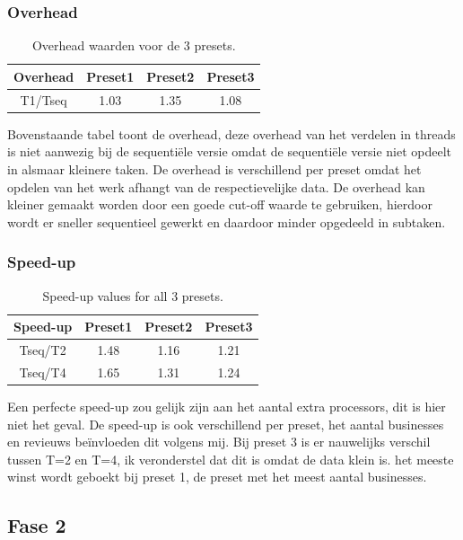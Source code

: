 \documentclass[]{article}
\begin{document}
\subsubsection{Overhead}

\begin{table}[h!]
	\centering
\begin{tabular}{|c|c|c|c|}
	\hline 
	Overhead & Preset1 & Preset2 & Preset3 \\ 
	\hline 
	T1/Tseq & 1.03 & 1.35 & 1.08 \\ 
	\hline 
\end{tabular} 
\caption{Overhead waarden voor de 3 presets.}
\label{table:2}
\end{table}

Bovenstaande tabel toont de overhead, deze overhead van het verdelen in threads is niet aanwezig bij de sequentiële versie omdat de sequentiële versie niet opdeelt in alsmaar kleinere taken. De overhead is verschillend per preset omdat het opdelen van het werk afhangt van de respectievelijke data.
De overhead kan kleiner gemaakt worden door een goede cut-off waarde te gebruiken, hierdoor wordt er sneller sequentieel gewerkt en daardoor minder opgedeeld in subtaken.

\subsubsection{Speed-up}
\begin{table}[h!]
	\centering
	\begin{tabular}{|c|c|c|c|}
		\hline 
		Speed-up & Preset1 & Preset2 & Preset3 \\ 
		\hline 
		Tseq/T2 & 1.48 & 1.16 & 1.21 \\ 
		\hline 
		\hline 
		Tseq/T4 & 1.65 & 1.31 & 1.24 \\ 
		\hline 
	\end{tabular} 
	\caption{Speed-up values for all 3 presets.}
	\label{table:2}
\end{table}

Een perfecte speed-up zou gelijk zijn aan het aantal extra processors, dit is hier niet het geval.
De speed-up is ook verschillend per preset, het aantal businesses en revieuws beïnvloeden dit volgens mij.
Bij preset 3 is er nauwelijks verschil tussen T=2 en T=4, ik veronderstel dat dit is omdat de data klein is.
het meeste winst wordt geboekt bij preset 1, de preset met het meest aantal businesses.

\subsection{Fase 2}
\end{document}
